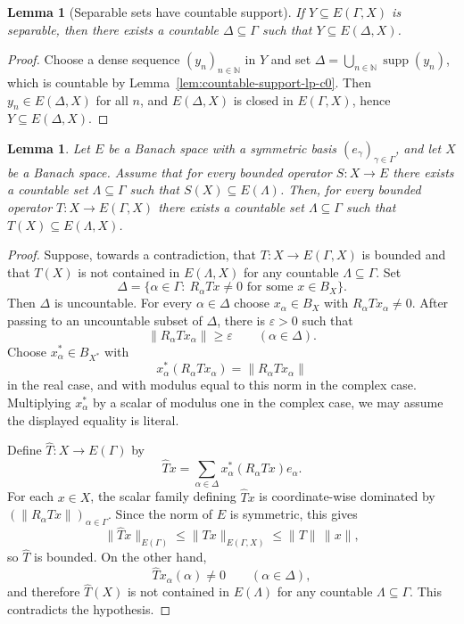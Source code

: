 \documentclass[11pt]{amsart}
\theoremstyle{plain}
\newtheorem{lemma}[theorem]{Lemma}
\theoremstyle{definition}
\numberwithin{equation}{section}
\newcommand{\norm}[1]{\lVert #1 \rVert}
\newcommand{\N}{\mathbb{N}}
\newcommand{\supp}{\operatorname{supp}}
\renewcommand{\le}{\leqslant}
\renewcommand{\ge}{\geqslant}
\begin{document}
\begin{lemma}[Separable sets have countable support]\label{lem:separable-support-lp-c0}
    If $Y\subseteq E(\Gamma, X)$ is separable, then there exists a countable $\Delta\subseteq\Gamma$ such that $Y\subseteq E(\Delta, X)$.
\end{lemma}

\begin{proof}
    Choose a dense sequence $(y_n)_{n\in\N}$ in $Y$ and set
    $\Delta=\bigcup_{n\in\N}\supp(y_n)$, which is countable by Lemma~\ref{lem:countable-support-lp-c0}.
    Then $y_n\in E(\Delta, X)$ for all $n$, and $E(\Delta, X)$ is closed in $E(\Gamma, X)$, hence $Y\subseteq E(\Delta, X)$.
\end{proof}

\begin{lemma}\label{lem:scalar-to-vector-support}
Let $E$ be a Banach space with a symmetric basis $(e_\gamma)_{\gamma\in\Gamma}$, and let $X$ be a Banach space.  Assume that for every bounded operator $S \colon X \to E$ there exists a countable set $\Lambda \subseteq \Gamma$ such that $S(X) \subseteq E(\Lambda)$.  Then, for every bounded operator $T \colon X \to E(\Gamma,X)$ there exists a countable set $\Lambda \subseteq \Gamma$ such that $T(X) \subseteq E(\Lambda, X)$.
\end{lemma}

\begin{proof}
Suppose, towards a contradiction, that $T\colon X\to E(\Gamma,X)$ is bounded and that $T(X)$ is not contained in $E(\Lambda,X)$ for any countable $\Lambda\subseteq\Gamma$.  Set
\[
    \Delta=\{\alpha\in\Gamma:\ R_\alpha T x\neq 0\text{ for some }x\in B_X\}.
\]
Then $\Delta$ is uncountable.  For every $\alpha\in\Delta$ choose $x_\alpha\in B_X$ with $R_\alpha T x_\alpha\neq0$.  After passing to an uncountable subset of $\Delta$, there is $\varepsilon>0$ such that
\[
    \norm{R_\alpha T x_\alpha}\ge \varepsilon\qquad(\alpha\in\Delta).
\]
Choose $x_\alpha^*\in B_{X^*}$ with
\[
    x_\alpha^*(R_\alpha T x_\alpha)=\norm{R_\alpha T x_\alpha}
\]
in the real case, and with modulus equal to this norm in the complex case.  Multiplying $x_\alpha^*$ by a scalar of modulus one in the complex case, we may assume the displayed equality is literal.

Define $\widehat T\colon X\to E(\Gamma)$ by
\[
    \widehat T x
    =\sum_{\alpha\in\Delta} x_\alpha^*(R_\alpha T x)e_\alpha.
\]
For each $x\in X$, the scalar family defining $\widehat T x$ is coordinate-wise dominated by $(\norm{R_\alpha Tx})_{\alpha\in\Gamma}$.  Since the norm of $E$ is symmetric, this gives
\[
    \norm{\widehat T x}_{E(\Gamma)}
    \le \norm{Tx}_{E(\Gamma,X)}
    \le \norm T\,\norm x,
\]
so $\widehat T$ is bounded.  On the other hand,
\[
    \widehat T x_\alpha(\alpha)\neq0\qquad(\alpha\in\Delta),
\]
and therefore $\widehat T(X)$ is not contained in $E(\Lambda)$ for any countable $\Lambda\subseteq\Gamma$.  This contradicts the hypothesis.
\end{proof}
\end{document}
